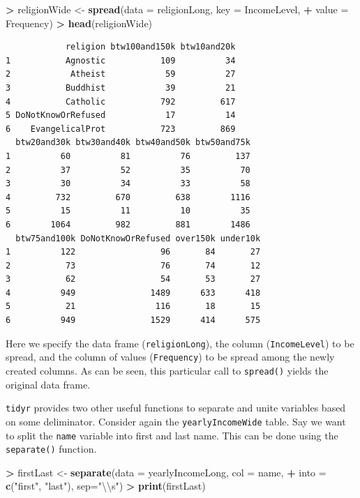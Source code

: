 \documentclass[]{krantz}
\makeatletter
\newenvironment{Shaded}{\begin{snugshade}}{\end{snugshade}}
\newcommand{\KeywordTok}[1]{\textcolor[rgb]{0.27,0.27,0.27}{\textbf{#1}}}
\newcommand{\DataTypeTok}[1]{\textcolor[rgb]{0.27,0.27,0.27}{#1}}
\newcommand{\CharTok}[1]{\textcolor[rgb]{0.5,0.5,0.5}{#1}}
\newcommand{\StringTok}[1]{\textcolor[rgb]{0.5,0.5,0.5}{#1}}
\newcommand{\OperatorTok}[1]{\textcolor[rgb]{0.43,0.43,0.43}{\textbf{#1}}}
\newcommand{\NormalTok}[1]{#1}
\newenvironment{kframe}{%
\medskip{}
\setlength{\fboxsep}{.8em}
 \def\at@end@of@kframe{}%
 \ifinner\ifhmode%
  \def\at@end@of@kframe{\end{minipage}}%
  \begin{minipage}{\columnwidth}%
 \fi\fi%
 \def\FrameCommand##1{\hskip\@totalleftmargin \hskip-\fboxsep
 \colorbox{shadecolor}{##1}\hskip-\fboxsep
     \hskip-\linewidth \hskip-\@totalleftmargin \hskip\columnwidth}%
 \MakeFramed {\advance\hsize-\width
   \@totalleftmargin\z@ \linewidth\hsize
   \@setminipage}}%
 {\par\unskip\endMakeFramed%
 \at@end@of@kframe}
\renewenvironment{Shaded}{\begin{kframe}}{\end{kframe}}
\makeatother
\begin{document}
\begin{Shaded}
\begin{Highlighting}[]
\OperatorTok{>}\StringTok{ }\NormalTok{religionWide <-}\StringTok{ }\KeywordTok{spread}\NormalTok{(}\DataTypeTok{data =}\NormalTok{ religionLong, }\DataTypeTok{key =}\NormalTok{ IncomeLevel, }
\OperatorTok{+}\StringTok{                        }\DataTypeTok{value =}\NormalTok{ Frequency)}
\OperatorTok{>}\StringTok{ }\KeywordTok{head}\NormalTok{(religionWide)}
\end{Highlighting}
\end{Shaded}

\begin{verbatim}
            religion btw100and150k btw10and20k
1           Agnostic           109          34
2            Atheist            59          27
3           Buddhist            39          21
4           Catholic           792         617
5 DoNotKnowOrRefused            17          14
6    EvangelicalProt           723         869
  btw20and30k btw30and40k btw40and50k btw50and75k
1          60          81          76         137
2          37          52          35          70
3          30          34          33          58
4         732         670         638        1116
5          15          11          10          35
6        1064         982         881        1486
  btw75and100k DoNotKnowOrRefused over150k under10k
1          122                 96       84       27
2           73                 76       74       12
3           62                 54       53       27
4          949               1489      633      418
5           21                116       18       15
6          949               1529      414      575
\end{verbatim}

Here we specify the data frame (\texttt{religionLong}), the column
(\texttt{IncomeLevel}) to be spread, and the column of values
(\texttt{Frequency}) to be spread among the newly created columns. As
can be seen, this particular call to \texttt{spread()} yields the
original data frame.

\texttt{tidyr} provides two other useful functions to separate and unite
variables based on some deliminator. Consider again the
\texttt{yearlyIncomeWide} table. Say we want to split the \texttt{name}
variable into first and last name. This can be done using the
\texttt{separate()} function.

\begin{Shaded}
\begin{Highlighting}[]
\OperatorTok{>}\StringTok{ }\NormalTok{firstLast <-}\StringTok{ }\KeywordTok{separate}\NormalTok{(}\DataTypeTok{data =}\NormalTok{ yearlyIncomeLong, }\DataTypeTok{col =}\NormalTok{ name, }
\OperatorTok{+}\StringTok{                       }\DataTypeTok{into =} \KeywordTok{c}\NormalTok{(}\StringTok{"first"}\NormalTok{, }\StringTok{"last"}\NormalTok{), }\DataTypeTok{sep=}\StringTok{"}\CharTok{\textbackslash{}\textbackslash{}}\StringTok{s"}\NormalTok{)}
\OperatorTok{>}\StringTok{ }\KeywordTok{print}\NormalTok{(firstLast)}
\end{Highlighting}
\end{Shaded}
\end{document}
